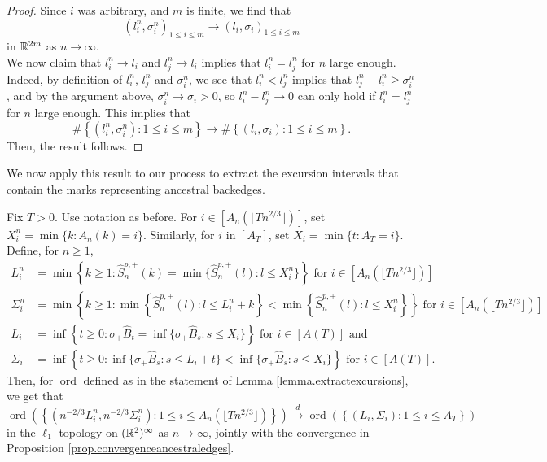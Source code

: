 \begin{proof}
Since $i$ was arbitrary, and $m$ is finite, we find that $$(l_i^n,\sigma_i^n)_{1\leq i\leq m}\to (l_i,\sigma_i)_{1\leq i\leq m}$$
in ${\mathbb R}^{2m}$ as $n\to \infty$. \\
We now claim that $l_i^n\to l_i$ and $l_j^n\to l_i$ implies that $l_i^n=l_j^n$ for $n$ large enough. Indeed, by definition of $l_i^n$, $l_j^n$ and $\sigma_i^n$, we see that $l_i^n<l_j^n$ implies that $l_j^n-l_i^n\geq \sigma_i^n$, and by the argument above, $\sigma_i^n\to \sigma_i>0$, so $l_i^n-l_j^n\to 0$ can only hold if $l_i^n=l_j^n$ for $n$ large enough. This implies that 
$$\#\left\{(l_i^n,\sigma_i^n):1\leq i \leq m\right\}\to \#\left\{(l_i,\sigma_i):1\leq i \leq m\right\}.$$
Then, the result follows.
\end{proof}

We now apply this result to our process to extract the excursion intervals that contain the marks representing ancestral backedges.
\begin{proposition}\label{prop.extractexcursions}
Fix $T>0$. Use notation as before. For $i\in \left[A_n\left(\lfloor T n^{2/3}\rfloor\right)\right]$, set $X_i^n=\min\{k:A_n(k)=i\}$. Similarly, for $i$ in $\left[A_T\right]$, set $X_i=\min\{t:A_T=i\}$. Define, for $n\geq 1$,
\begin{align*}L_i^n&=\min\left\{k\geq 1:\hat{S}^{p,+}_n(k)=\min\{\hat{S}^{p,+}_n(l):l\leq X_i^n\}\right\}\text{ for }i\in \left[A_n\left(\lfloor T n^{2/3}\rfloor\right)\right]\\
\Sigma_i^n&=\min\left\{k \geq 1: \min\left\{\hat{S}^{p,+}_n(l):l\leq L_i^n+k\right\} < \min\left\{\hat{S}^{p,+}_n(l):l\leq X_i^n\right\}\right\}\text{ for }i\in \left[A_n\left(\lfloor T n^{2/3}\rfloor\right)\right]\\
L_i&=\inf\left\{t\geq 0:\sigma_+\hat{B}_t=\inf\{\sigma_+\hat{B}_s:s\leq X_i\}\right\}\text{ for }i\in \left[A(T )\right]\text{ and}\\
\Sigma_i&=\inf\left\{ t\geq 0: \inf\{\sigma_+\hat{B}_s:s\leq L_i+t\} < \inf\{\sigma_+\hat{B}_s:s\leq X_i\}\right\}\text{ for }i\in \left[A(T )\right].
\end{align*}
Then, for $\operatorname{ord}$ defined as in the statement of Lemma \ref{lemma.extractexcursions}, we get that
$$\operatorname{ord}\left(\left\{\left(n^{-2/3}L_i^n,n^{-2/3}\Sigma_i^n\right):1\leq i \leq A_n\left(\lfloor T n^{2/3}\rfloor\right)\right\}\right)\overset{d}{\to} \operatorname{ord}\left(\left\{(L_i,\Sigma_i):1\leq i \leq A_T\right\}\right)$$
in the $\ell_1$-topology on $({\mathbb R}^2)^\infty$ as $n\to \infty$, jointly with the convergence in Proposition \ref{prop.convergenceancestraledges}. 
\end{proposition}
